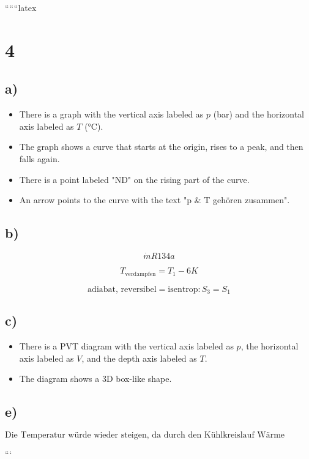 
``````latex


\section*{4}

\subsection*{a)}

\begin{itemize}
    \item There is a graph with the vertical axis labeled as $p$ (bar) and the horizontal axis labeled as $T$ (°C).
    \item The graph shows a curve that starts at the origin, rises to a peak, and then falls again.
    \item There is a point labeled "ND" on the rising part of the curve.
    \item An arrow points to the curve with the text "p \& T gehören zusammen".
\end{itemize}

\subsection*{b)}

\[
\dot{m} R134a
\]

\[
T_{\text{verdampfen}} = T_1 - 6K
\]

\[
\text{adiabat, reversibel} = \text{isentrop} : S_3 = S_1
\]

\subsection*{c)}

\begin{itemize}
    \item There is a PVT diagram with the vertical axis labeled as $p$, the horizontal axis labeled as $V$, and the depth axis labeled as $T$.
    \item The diagram shows a 3D box-like shape.
\end{itemize}

\subsection*{e)}

\[
\text{Die Temperatur würde wieder steigen, da durch den Kühlkreislauf Wärme dazukommt.}
\]

```